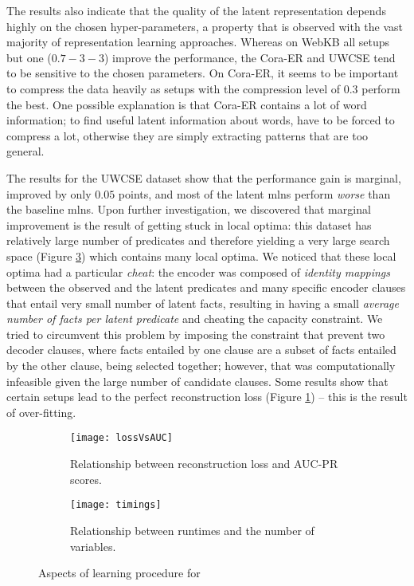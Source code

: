 The results also indicate that the quality of the latent representation depends highly on the chosen hyper-parameters, a property that is observed with the vast majority of representation learning approaches.
Whereas on WebKB all setups but one ($0.7-3-3$) improve the performance, the Cora-ER and UWCSE tend to be sensitive to the chosen parameters.
On Cora-ER, it seems to be important to compress the data heavily as setups with the compression level of $0.3$ perform the best.
One possible explanation is that Cora-ER contains a lot of word information; to find useful latent information about words,  have to be forced to compress a lot, otherwise they are simply extracting patterns that are too general.

The results for the UWCSE dataset show that the performance gain is marginal, improved by only $0.05$ points, and most of the latent \gls{mln}s perform \textit{worse} than the baseline \gls{mln}s.
Upon further investigation, we discovered that marginal improvement is the result of  getting stuck in local optima: this dataset has relatively large number of predicates  and therefore yielding a very large search space (Figure \ref{fig:timings}) which contains many local optima.
We noticed that these local optima had a particular \textit{cheat}: the encoder was composed of \textit{identity mappings} between the observed and the latent predicates and many specific encoder clauses that entail very small number of latent facts, resulting in having a small \textit{average number of facts per latent predicate} and cheating the capacity constraint.
We tried to circumvent this problem by imposing the constraint that prevent two decoder clauses, where facts entailed by one clause are a subset of facts entailed by the other clause, being selected together; however, that was computationally infeasible given the large number of candidate clauses.
Some results show that certain setups lead to the perfect reconstruction loss (Figure \ref{fig:lossvsaucpr}) -- this is the result of over-fitting.




\begin{figure}[t!]
	\centering
	\begin{subfigure}[t]{0.48\linewidth}
		\centering
		\texttt{[image: lossVsAUC]}
		\caption{Relationship between reconstruction loss and AUC-PR scores. \label{fig:lossvsaucpr}}
	\end{subfigure}
	\hspace{.2em}
	\begin{subfigure}[t]{0.48\linewidth}
		\centering
		\texttt{[image: timings]}

		\caption{Relationship between runtimes and the number of variables.\label{fig:timings}}
	\end{subfigure}
	\caption{Aspects of learning procedure for }
\end{figure}



